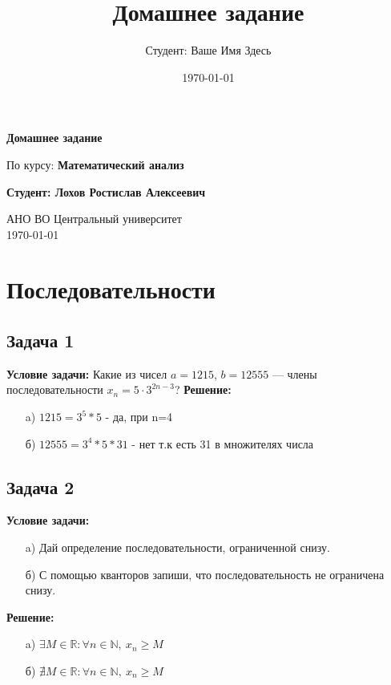 \documentclass[a4paper,12pt]{article}
\title{Домашнее задание}
\author{Студент: Ваше Имя Здесь}
\date{\today}
\begin{document}
\begin{titlepage}
    \centering
    \vspace*{1cm}

    \Huge
    \textbf{Домашнее задание}

    \vspace{0.5cm}
    \LARGE
    По курсу: \textbf{Математический анализ}

    \vspace{1.5cm}

    \textbf{Студент: Лохов Ростислав Алексеевич}

    \vfill

    \Large
    АНО ВО Центральный университет\\
    \vspace{0.3cm}
    \today

\end{titlepage}

\tableofcontents
\newpage

\section{Последовательности}

\subsection{Задача 1}
\textbf{Условие задачи:}
Какие из чисел \(a = 1215\), \(b = 12 555\) — члены последовательности \(x_n = 5 \cdot 3^{2n-3}\)?
\textbf{Решение:}
\begin{itemize}
    \item[a)] $1215 = 3^5*5$ - да, при n=4
    \item[б)] $12555 = 3^4*5*31$ - нет т.к есть 31 в множителях числа
\end{itemize}
\vspace{1cm}

\subsection{Задача 2}
\textbf{Условие задачи:}
\begin{itemize}
    \item[a)] Дай определение последовательности, ограниченной снизу.
    \item[б)] С помощью кванторов запиши, что последовательность не ограничена снизу.
\end{itemize}
\textbf{Решение:}
\begin{itemize}
    \item[a)] $\exists M \in \mathbb{R} : \forall n \in \mathbb{N}, \ x_n \geq M$
    \item[б)] $\nexists M \in \mathbb{R} : \forall n \in \mathbb{N}, \ x_n \geq M$
\end{itemize}
\end{document}
